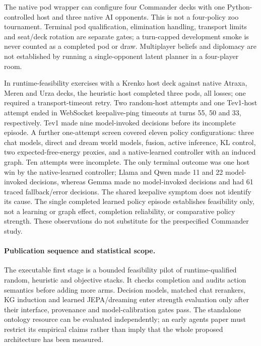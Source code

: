 \documentclass[11pt,a4paper]{article}
\theoremstyle{definition}
\theoremstyle{plain}
\begin{document}
The native pod wrapper can configure four Commander decks with one
Python-controlled host and three native AI opponents. This is not a
four-policy zoo tournament. Terminal pod qualification, elimination handling,
transport limits and seat/deck rotation are separate gates; a turn-capped
development smoke is never counted as a completed pod or draw. Multiplayer
beliefs and diplomacy are not established by running a single-opponent
latent planner in a four-player room.

In runtime-feasibility exercises with a Krenko host deck against native
Atraxa, Meren and Urza decks, the heuristic host completed three pods, all
losses; one required a transport-timeout retry. Two random-host attempts and
one Tev1-host attempt ended in WebSocket keepalive-ping timeouts at turns 55,
50 and 33, respectively. Tev1 made nine model-invoked decisions before its
incomplete episode. A further one-attempt screen covered eleven policy
configurations: three chat models, direct and dream world models, fusion,
active inference, KL control, two expected-free-energy proxies, and a
native-learned controller with an induced graph. Ten attempts were incomplete.
The only terminal outcome was one host win by the native-learned controller;
Llama and Qwen made 11 and 22 model-invoked decisions, whereas Gemma made no
model-invoked decisions and had 61 traced fallback/error decisions. The shared
keepalive symptom does not identify its cause. The single completed learned
policy episode establishes feasibility only, not a learning or graph effect,
completion reliability, or comparative policy strength. These observations do
not substitute for the prespecified Commander study.

\paragraph{Publication sequence and statistical scope.}
The executable first stage is a bounded feasibility pilot of runtime-qualified
random, heuristic and objective stacks. It checks completion and audits action
semantics before adding more arms. Decision models, matched chat rerankers,
KG induction and learned JEPA/dreaming enter strength evaluation only after
their interface, provenance and model-calibration gates pass. The standalone
ontology resource can be evaluated independently; an early agents paper must
restrict its empirical claims rather than imply that the whole proposed
architecture has been measured.
\end{document}
